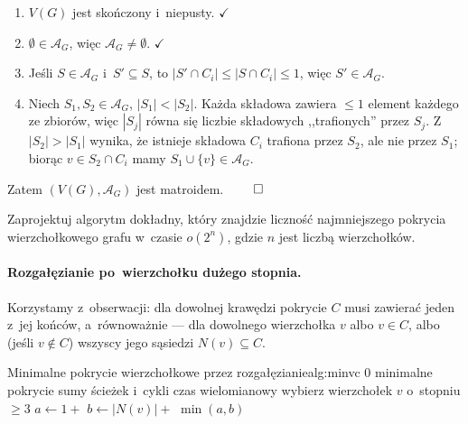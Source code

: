 \newlength{}
\settowidth{}
\begin{enumerate}[
		label=(wł.\ \arabic*),
		align=left,
		labelwidth=\labelw,
		labelsep=0pt,
		leftmargin=\dimexpr\labelw-2em\relax,
		itemindent=2em
	]
	\item[(wł.\ \ref*{N-matroid:skończoność})] $V(G)$ jest skończony i~niepusty. $\checkmark$
	\item[(wł.\ \ref*{N-matroid:niepustość})] $\emptyset\in\mathcal{A}_G$, więc $\mathcal{A}_G\neq\emptyset$. $\checkmark$
	\item[(wł.\ \ref*{N-matroid:dziedziczność})] Jeśli $S\in\mathcal{A}_G$ i~$S'\subseteq S$, to
	      $|S'\cap C_i|\le|S\cap C_i|\le 1$, więc $S'\in\mathcal{A}_G$.
	\item[(wł.\ \ref*{N-matroid:wymiana})] Niech $S_1,S_2\in\mathcal{A}_G$, $|S_1|<|S_2|$. Każda
	      składowa zawiera $\le 1$ element każdego ze zbiorów, więc $|S_j|$ równa
	      się liczbie składowych ,,trafionych'' przez $S_j$. Z~$|S_2|>|S_1|$
	      wynika, że istnieje składowa $C_i$ trafiona przez $S_2$, ale nie przez
	      $S_1$; biorąc $v\in S_2\cap C_i$ mamy $S_1\cup\{v\}\in\mathcal{A}_G$.
\end{enumerate}
Zatem $(V(G),\mathcal{A}_G)$ jest matroidem. $\qed$

\clearpage
\begin{zadanie}
	Zaprojektuj algorytm dokładny, który znajdzie liczność najmniejszego pokrycia
	wierzchołkowego grafu w~czasie $o(2^n)$, gdzie $n$ jest liczbą wierzchołków.
\end{zadanie}

\paragraph{Rozgałęzianie po~wierzchołku dużego stopnia.}
Korzystamy z~obserwacji: dla dowolnej krawędzi pokrycie $C$ musi zawierać jeden
z~jej końców, a~równoważnie --- dla dowolnego wierzchołka $v$ albo $v\in C$,
albo (jeśli $v\notin C$) wszyscy jego sąsiedzi $N(v)\subseteq C$.

\begin{alg}{Minimalne pokrycie wierzchołkowe przez rozgałęzianie}{alg:minvc}
	\State \Return $0$
	\EndIf
	\State \Return minimalne pokrycie sumy ścieżek i~cykli
	       \Statex \hfill czas wielomianowy
	\EndIf
	\State wybierz wierzchołek $v$ o~stopniu $\ge 3$
	\State $a\gets 1+{}$
	\State $b\gets |N(v)|+{}$
	\State \Return $\min(a,b)$
	\EndFunction
\end{alg}


